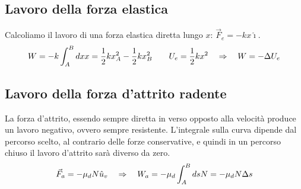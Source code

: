 \subsection{Lavoro della forza elastica}
Calcoliamo il lavoro di una forza elastica diretta lungo
$x$: $\vec F_e = -kx\hat\imath$.
\begin{equation}
    W = -k\int_A^Bdx x = \frac12 kx_A^2-\frac12 kx^2_B\quad\quad
    U_e = \frac12 kx^2\quad\Rightarrow\quad W = -\Delta U_e
\label{eq:work&energy:elastic_energy}
\end{equation}
\subsection{Lavoro della forza d'attrito radente}
La forza d'attrito, essendo sempre diretta in verso opposto alla velocità
produce un lavoro negativo, ovvero sempre resistente. L'integrale sulla
curva dipende dal percorso scelto, al contrario delle forze conservative,
e quindi in un percorso chiuso il lavoro d'attrito sarà diverso da zero.
\begin{equation}
    \vec F_a = -\mu_d N \hat u_v\quad\Rightarrow\quad W_a = -\mu_d\int_A^BdsN =
    -\mu_dN\Delta s
    \label{eq:work&energy:work_friction}
\end{equation}
